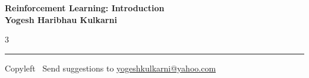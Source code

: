 \documentclass[8pt,landscape]{article}
\begin{document}
\footnotesize


\begin{center}
\Large{\textbf{Reinforcement Learning: Introduction\\ Yogesh Haribhau Kulkarni}}
\end{center}

\begin{multicols}{3}

\end{multicols}

\rule{\linewidth}{0.25pt}
\scriptsize
Copyleft \textcopyleft\  Send suggestions to
\href{http://www.yogeshkulkarni.com}{yogeshkulkarni@yahoo.com}
\end{document}
